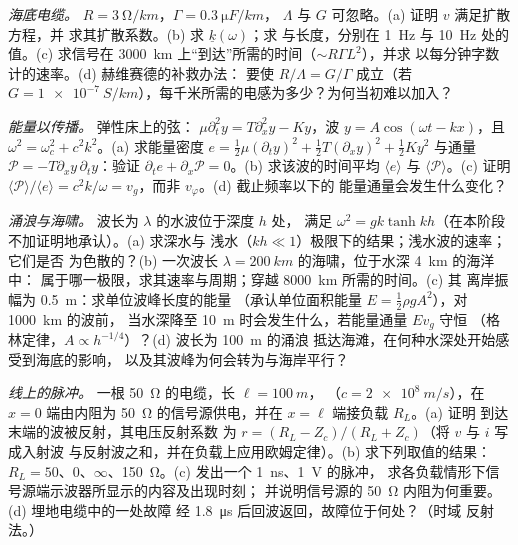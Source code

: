 \begin{exercise}[$\star\star$]\label{exo:b2:dispersion-wave-packets:9}
\emph{海底电缆。} $R = \qty{3}{\ohm/km}$，$\Gamma = \qty{0.3}{\micro F/km}$，
$\Lambda$ 与 $G$ 可忽略。(a) 证明 $v$ 满足扩散方程，并
求其扩散系数。(b) 求 $\underline k(\omega)$；求
与长度，分别在 \qty{1}{Hz} 与 \qty{10}{Hz} 处的值。(c)
求信号在 \qty{3000}{km} 上“到达”所需的时间（$\sim R\Gamma L^2$），并求
以每分钟字数计的速率。(d) 赫维赛德的补救办法：
要使 $R/\Lambda = G/\Gamma$ 成立（若 $G = \qty{1e-7}{S/km}$），每千米所需的电感为多少？为何当初难以加入？
\end{exercise}

\begin{exercise}[$\star\star\star$]\label{exo:b2:dispersion-wave-packets:10}
\emph{能量以传播。} 弹性床上的弦：
$\mu\partial_t^2y = T\partial_x^2y - Ky$，波 $y = A\cos(\omega t - kx)$，且 $\omega^2 =
\omega_c^2 + c^2k^2$。(a) 求能量密度 $e = \tfrac12\mu(\partial_ty)^2 + \tfrac12T
(\partial_xy)^2 + \tfrac12Ky^2$ 与通量 $\mathcal P = -T\partial_xy\,\partial_ty$：验证
$\partial_te + \partial_x\mathcal P = 0$。(b) 求该波的时间平均 $\langle e\rangle$ 与
$\langle\mathcal P\rangle$。(c) 证明 $\langle\mathcal P\rangle/
\langle e\rangle = c^2k/\omega = v_g$，而非 $v_\varphi$。(d) 截止频率以下的
能量通量会发生什么变化？
\end{exercise}

\begin{exercise}[$\star\star\star$]\label{exo:b2:dispersion-wave-packets:11}
\emph{涌浪与海啸。} 波长为 $\lambda$ 的水波位于深度 $h$ 处，
满足 $\omega^2 = gk\tanh kh$（在本阶段不加证明地承认）。(a) 求深水与
浅水（$kh \ll 1$）极限下的结果；浅水波的速率；它们是否
为色散的？(b) 一次波长 $\lambda = \qty{200}{km}$ 的海啸，位于水深 \qty{4}{km} 的海洋中：
属于哪一极限，求其速率与周期；穿越 \qty{8000}{km} 所需的时间。(c) 其
离岸振幅为 \qty{0.5}{m}：求单位波峰长度的能量
（承认单位面积能量 $E = \tfrac12\rho gA^2$），对 \qty{1000}{km} 的波前，
当水深降至 \qty{10}{m} 时会发生什么，若能量通量 $Ev_g$ 守恒
（格林定律，$A \propto h^{-1/4}$）？(d) 波长为 \qty{100}{m} 的涌浪
抵达海滩，在何种水深处开始感受到海底的影响，
以及其波峰为何会转为与海岸平行？
\end{exercise}

\begin{exercise}[$\star\star\star$]\label{exo:b2:dispersion-wave-packets:12}
\emph{线上的脉冲。} 一根 \qty{50}{\ohm} 的电缆，长 $\ell = \qty{100}{m}$，
（$c = \qty{2e8}{m/s}$），在 $x = 0$ 端由内阻为
\qty{50}{\ohm} 的信号源供电，并在 $x = \ell$ 端接负载 $R_L$。(a) 证明
到达末端的波被反射，其电压反射系数
为 $r = (R_L - Z_c)/(R_L + Z_c)$（将 $v$ 与 $i$ 写成入射波
与反射波之和，并在负载上应用欧姆定律）。(b) 求下列取值的结果：
$R_L = 50$、$0$、$\infty$、\qty{150}{\ohm}。(c) 发出一个 \qty{1}{ns}、\qty{1}{V} 的脉冲，
求各负载情形下信号源端示波器所显示的内容及出现时刻；
并说明信号源的 \qty{50}{\ohm} 内阻为何重要。(d) 埋地电缆中的一处故障
经 \qty{1.8}{\micro s} 后回波返回，故障位于何处？（时域
反射法。）
\end{exercise}

